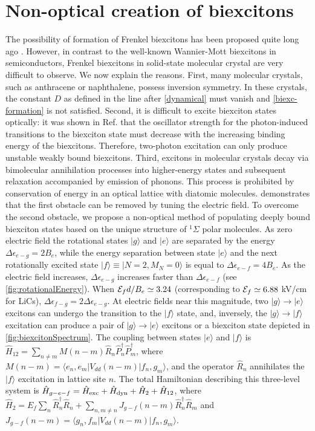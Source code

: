 \section{Non-optical creation of biexcitons} 
The possibility of formation of Frenkel biexcitons has been proposed quite long ago \cite{efremov1973}. However, in 
contrast to the well-known Wannier-Mott biexcitons in semiconductors, Frenkel biexcitons in solid-state molecular
 crystal are very difficult to observe. 
We now explain the reasons. First, many molecular crystals, such as anthracene or naphthalene,  possess inversion
 symmetry. In these crystals, the constant $D$ as defined in the line after \autoref{dynamical} must vanish and 
\autoref{biexc-formation} is not satisfied. Second, it is difficult to excite biexciton states optically: it was shown
 in Ref.\cite{Ezaki1994} that the oscillator strength for the photon-induced transitions to the biexciton state must
 decrease with the increasing binding energy of the biexcitons. Therefore, two-photon excitation can only produce
 unstable weakly bound biexcitons. Third, excitons in molecular crystals decay via bimolecular annihilation processes
 into higher-energy states and subsequent relaxation accompanied by emission of phonons. This process is prohibited
 by conservation of energy in an optical lattice with diatomic molecules.   demonstrates
 that the first obstacle can be removed by tuning 
the electric field. To overcome the second obstacle, we propose a non-optical method of populating deeply bound
 biexciton states based on the unique structure of $^1\Sigma$ polar molecules. 
As zero electric field the rotational states $|g\rangle$ and $|e\rangle$ are separated by the energy 
$\Delta \epsilon_{e - g}= 2 B_e$, while the energy separation between state $|e\rangle$ and the next rotationally
 excited state $|f\rangle \equiv |N=2, M_N = 0\rangle$ is equal to $\Delta \epsilon_{e- f}=4B_e$. As the electric field
 increases, $\Delta \epsilon_{e - g}$ increases faster than $\Delta \epsilon_{e - f}$ (see \autoref{fig:rotationalEnergy}).
When ${\cal E}_f d/B_e \simeq 3.24$ (corresponding to ${\cal E}_f \simeq 6.88$ kV/cm for LiCs), 
$\Delta \epsilon_{f - g} = 2 \Delta \epsilon_{e - g}$. At electric fields near this magnitude, two 
$| g \rangle \rightarrow | e \rangle$ excitons can undergo the transition to the $|f \rangle$ state, and, inversely, 
the $|g \rangle \rightarrow |f\rangle$ excitation can produce a pair of $|g\rangle \rightarrow |e \rangle$ excitons or a
 biexciton state depicted in \autoref{fig:biexcitonSpectrum}. The coupling between states $| e \rangle$ and $| f \rangle$ is
$\hat{H}_{12} = \sum\limits_{n \neq m} M(n-m) \hat{R}_n  \hat{P}_n^\dag
\hat{P}_m^\dag$, where $M(n-m) = \langle e_{n},e_{m} | V_{dd}(n-m) | f_{n},g_{m}
\rangle$, and the operator $\hat{R}_n$ annihilates the $| f \rangle$
excitation in lattice site $n$. The total Hamiltonian describing this three-level 
system is $\hat{H}_{g-e-f} = \hat{H}_{\rm exc} + \hat{H}_{\rm dyn} +  \hat{H}_2 + \hat{H}_{12}$, where
$\hat{H}_2 = E_f \sum\limits_n \hat{R}_n^\dag \hat{R}_n   + \sum\limits_{n,m \neq n} J_{g-f}(n-m) \hat{R}_n^\dag \hat{R}_m $ and $J_{g-f}(n-m) = \langle g_{n},f_{m} | V_{dd}(n-m) | f_{n},g_{m} \rangle$.

